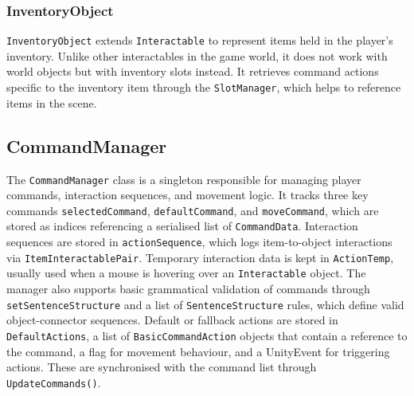 \subsubsection{InventoryObject}
\verb|InventoryObject| extends \verb|Interactable| to represent items held in the player’s inventory. Unlike other interactables in the game world, it does not work with world objects but with inventory slots instead. It retrieves command actions specific to the inventory item through the \verb|SlotManager|, which helps to reference items in the scene. 

\subsection{CommandManager}
The \verb|CommandManager| class is a singleton responsible for managing player commands, interaction sequences, and movement logic. It tracks three key commands \verb|selectedCommand|, \verb|defaultCommand|, and \verb|moveCommand|, which are stored as indices referencing a serialised list of \verb|CommandData|. Interaction sequences are stored in \verb|actionSequence|, which logs item-to-object interactions via \verb|ItemInteractablePair|. Temporary interaction data is kept in \verb|ActionTemp|, usually used when a mouse is hovering over an \verb|Interactable| object. The manager also supports basic grammatical validation of commands through \verb|setSentenceStructure| and a list of \verb|SentenceStructure| rules, which define valid object-connector sequences. Default or fallback actions are stored in \verb|DefaultActions|, a list of \verb|BasicCommandAction| objects that contain a reference to the command, a flag for movement behaviour, and a UnityEvent for triggering actions. These are synchronised with the command list through \verb|UpdateCommands()|.
 


